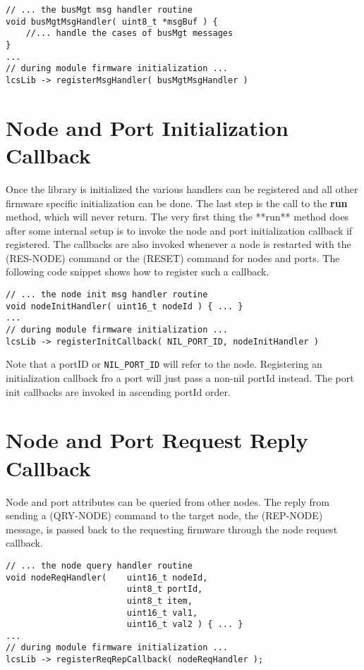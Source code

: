 \lstset{style=codesnippetstyle}
\begin{lstlisting}
// ... the busMgt msg handler routine
void busMgtMsgHandler( uint8_t *msgBuf ) {
	//... handle the cases of busMgt messages
}
...
// during module firmware initialization ...
lcsLib -> registerMsgHandler( busMgtMsgHandler )
\end{lstlisting}

\section{Node and Port Initialization Callback}

Once the library is initialized the various handlers can be registered and all other firmware specific initialization can be done. The last step is the call to the \textbf{run} method, which will never return. The very first thing the **run** method does after some internal setup is to invoke the node and port initialization callback if registered. The callbacks are also invoked whenever a node is restarted with the (RES-NODE) command or the (RESET) command for nodes and ports. The following code snippet shows how to register such a callback.

\lstset{style=codesnippetstyle}
\begin{lstlisting}
// ... the node init msg handler routine
void nodeInitHandler( uint16_t nodeId ) { ... }
...
// during module firmware initialization ...
lcsLib -> registerInitCallback( NIL_PORT_ID, nodeInitHandler )
\end{lstlisting}

Note that a portID or \texttt{NIL\_PORT\_ID} will refer to the node. Registering an initialization callback fro a port will just pass a non-nil portId instead. The port init callbacks are invoked in ascending portId order.

\section{Node and Port Request Reply Callback}

Node and port attributes can be queried from other nodes. The reply from sending a (QRY-NODE) command to the target node, the (REP-NODE) message, is passed back to the requesting firmware through the node request callback.

\lstset{style=codesnippetstyle}
\begin{lstlisting}
// ... the node query handler routine
void nodeReqHandler(    uint16_t nodeId, 
                        uint8_t portId, 
                        uint8_t item, 
                        uint16_t val1, 
                        uint16_t val2 ) { ... }
...
// during module firmware initialization ...
lcsLib -> registerReqRepCallback( nodeReqHandler );
\end{lstlisting}

